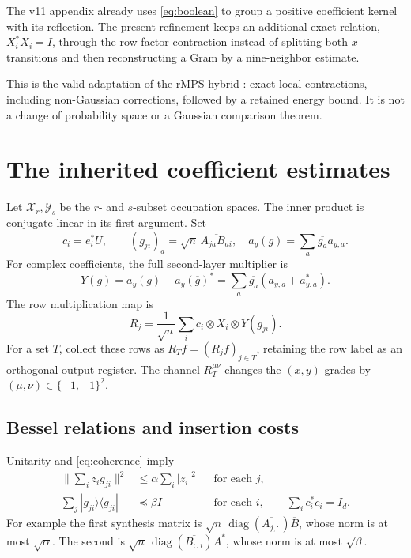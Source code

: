 \documentclass[11pt]{article}
\numberwithin{equation}{section}
\theoremstyle{definition}\newtheorem{definition}[theorem]{Definition}
\theoremstyle{remark}\newtheorem{remark}[theorem]{Remark}
\newcommand{\norm}[1]{\lVert#1\rVert}\newcommand{\ip}[2]{\langle#1,#2\rangle}
\newcommand{\diag}{\operatorname{diag}}
\begin{document}
The v11 appendix already uses \eqref{eq:boolean} to group a positive coefficient kernel with its reflection. The present refinement keeps an additional exact relation, $X_i^*X_i=I$, through the row-factor contraction instead of splitting both $x$ transitions and then reconstructing a Gram by a nine-neighbor estimate.

This is the valid adaptation of the rMPS hybrid \cite{Hybrid}: exact local contractions, including non-Gaussian corrections, followed by a retained energy bound. It is not a change of probability space or a Gaussian comparison theorem.

\section{The inherited coefficient estimates}
\label{sec:inputs}
Let $\mathcal X_r,\mathcal Y_s$ be the $r$- and $s$-subset occupation spaces. The inner product is conjugate linear in its first argument. Set
\begin{equation}
 c_i=e_i^*U,\qquad (g_{ji})_a=\sqrt n\,\overline{A_{ja}B_{ai}},
 \quad a_y(g)=\sum_a\overline{g_a}a_{y,a}.
 \label{eq:coeff}
\end{equation}
For complex coefficients, the full second-layer multiplier is
\[
 Y(g)=a_y(g)+a_y(\overline g)^*
       =\sum_a\overline{g_a}(a_{y,a}+a_{y,a}^*).
\]
The row multiplication map is
\begin{equation}
 R_j=\frac1{\sqrt n}\sum_i c_i\otimes X_i\otimes Y(g_{ji}).
 \label{eq:row}
\end{equation}
For a set $T$, collect these rows as $R_Tf=(R_jf)_{j\in T}$, retaining the row label as an orthogonal output register. The channel $R_T^{\mu\nu}$ changes the $(x,y)$ grades by $(\mu,\nu)\in\{+1,-1\}^2$.

\subsection{Bessel relations and insertion costs}
Unitarity and \eqref{eq:coherence} imply
\begin{align}
 \norm{\sum_i z_i g_{ji}}^2&\le\alpha\sum_i|z_i|^2
          &&\text{for each }j,\nonumber\\
 \sum_j|g_{ji}\rangle\langle g_{ji}|&\preceq\beta I
          &&\text{for each }i,\qquad \sum_i c_i^*c_i=I_d.
 \label{eq:bessel}
\end{align}
For example the first synthesis matrix is $\sqrt n\,\diag(\overline{A_{j,:}})\overline B$, whose norm is at most $\sqrt\alpha$. The second is $\sqrt n\,\diag(\overline{B_{:,i}})A^*$, whose norm is at most $\sqrt\beta$.
\end{document}
